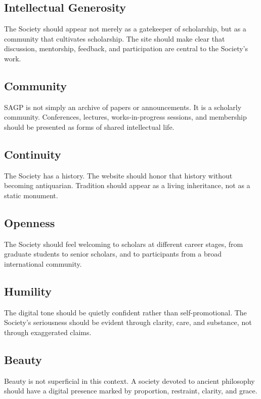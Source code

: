 \documentclass[11pt]{article}
\begin{document}
\subsection{Intellectual Generosity}

The Society should appear not merely as a gatekeeper of scholarship, but as a community that cultivates scholarship. The site should make clear that discussion, mentorship, feedback, and participation are central to the Society's work.

\subsection{Community}

SAGP is not simply an archive of papers or announcements. It is a scholarly community. Conferences, lectures, works-in-progress sessions, and membership should be presented as forms of shared intellectual life.

\subsection{Continuity}

The Society has a history. The website should honor that history without becoming antiquarian. Tradition should appear as a living inheritance, not as a static monument.

\subsection{Openness}

The Society should feel welcoming to scholars at different career stages, from graduate students to senior scholars, and to participants from a broad international community.

\subsection{Humility}

The digital tone should be quietly confident rather than self-promotional. The Society's seriousness should be evident through clarity, care, and substance, not through exaggerated claims.

\subsection{Beauty}

Beauty is not superficial in this context. A society devoted to ancient philosophy should have a digital presence marked by proportion, restraint, clarity, and grace.
\end{document}
